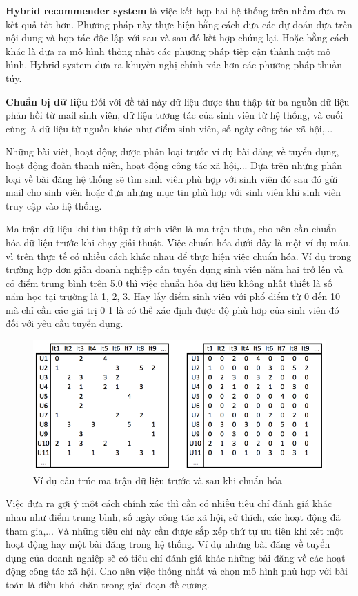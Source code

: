\textbf{Hybrid recommender system} là việc kết hợp hai hệ thống trên nhằm đưa ra kết quả tốt hơn. Phương pháp này thực hiện bằng cách đưa các dự đoán dựa trên nội dung và hợp tác độc lập với sau và sau đó kết hợp chúng lại. Hoặc bằng cách khác là đưa ra mô hình thống nhất các phương pháp tiếp cận thành một mô hình. Hybrid system đưa ra khuyến nghị chính xác hơn các phương pháp thuần túy.  

\textbf{Chuẩn bị dữ liệu}
Đối với đề tài này dữ liệu được thu thập từ ba nguồn dữ liệu phản hồi từ mail sinh viên, dữ liệu tương tác của sinh viên từ hệ thống, và cuối cùng là dữ liệu từ nguồn khác như điểm sinh viên, số ngày công tác xã hội,...

Những bài viết, hoạt động được phân loại trước ví dụ bài đăng về tuyển dụng, hoạt động đoàn thanh niên, hoạt động công tác xã hội,... Dựa trên những phân loại về bài đăng hệ thống sẽ tìm sinh viên phù hợp với sinh viên đó sau đó gửi mail cho sinh viên hoặc đưa những mục tin phù hợp với sinh viên khi sinh viên truy cập vào hệ thống. 

Ma trận dữ liệu khi thu thập từ sinh viên là ma trận thưa, cho nên cần chuẩn hóa dữ liệu trước khi chạy giải thuật. Việc chuẩn hóa dưới đây là một ví dụ mẫu, vì trên thực tế có nhiều cách khác nhau để thực hiện việc chuẩn hóa. Ví dụ trong trường hợp đơn giản  doanh nghiệp cần tuyển dụng sinh viên năm hai trở lên và có điểm trung bình trên 5.0 thì việc chuẩn hóa dữ liệu không nhất thiết là số năm học tại trường là 1, 2, 3. Hay lấy điểm sinh viên với phổ điểm từ 0 đến 10 mà chỉ cần các giá trị 0 1 là có thể xác định được độ phù hợp của sinh viên đó đối với yêu cầu tuyển dụng.

\begin{figure}[h]
\centering
\includegraphics[width=13cm]{image/data-normalization.png}
\caption{Ví dụ cấu trúc ma trận dữ liệu trước và sau khi chuẩn hóa}
\end{figure}

Việc đưa ra gợi ý một cách chính xác thì cần có nhiều tiêu chí đánh giá khác nhau như điểm trung bình, số ngày công tác xã hội, sở thích, các hoạt động đã tham gia,... Và những tiêu chí này cần được sắp xếp thứ tự ưu tiên khi xét một hoạt động hay một bài đăng trong hệ thống. Ví dụ những bài đăng về tuyển dụng của doanh nghiệp sẽ có tiêu chí đánh giá khác những bài đăng về các hoạt động công tác xã hội. Cho nên việc thống nhất và chọn mô hình phù hợp với bài toán là điều khó khăn trong giai đoạn đề cương.

